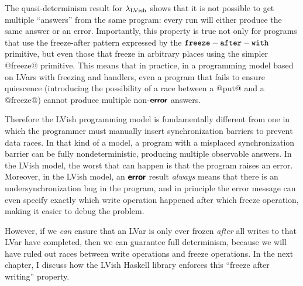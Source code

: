 
The quasi-determinism result for $\lambda_{\textrm{LVish}}$ shows that it is not
possible to get multiple ``answers'' from the same program: every run
will either produce the same answer or an error.  Importantly, this
property is true not only for programs that use the freeze-after
pattern expressed by the ${\mbox{\texttt{freeze}}-\mbox{\texttt{after}}-\mbox{\texttt{with}}}$ primitive, but even those that freeze
in arbitrary places using the simpler @freeze@ primitive.  This means
that in practice, in a programming model based on LVars with freezing
and handlers, even a program that fails to ensure quiescence
(introducing the possibility of a race between a @put@ and a
@freeze@) cannot produce multiple non-$\textbf{\textsf{error}}$ answers.

Therefore the LVish programming model is fundamentally different from
one in which the programmer must manually insert synchronization
barriers to prevent data races.  In that kind of a model, a program
with a misplaced synchronization barrier can be fully
nondeterministic, producing multiple observable answers.  In the LVish
model, the worst that can happen is that the program raises an error.
Moreover, in the LVish model, an $\textbf{\textsf{error}}$ result \emph{always} means
that there is an undersynchronization bug in the program, and in
principle the error message can even specify exactly which write
operation happened after which freeze operation, making it easier to
debug the problem.

However, if we \emph{can} ensure that an LVar is only ever frozen
\emph{after} all writes to that LVar have completed, then we can
guarantee full determinism, because we will have ruled out races
between write operations and freeze operations.  In the next chapter,
I discuss how the LVish Haskell library enforces this ``freeze after
writing'' property.
